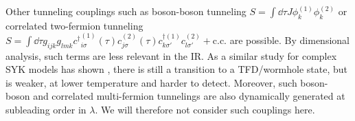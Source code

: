 Other tunneling couplings such as boson-boson tunneling $S=\int\dd\tau J\phi^{(1)}_k\phi^{(2)}_k$ or correlated two-fermion tunneling $S=\int\dd\tau g_{ijk}g_{lmk} {c^\dagger}^{(1)}_{i\sigma}(\tau)c^{(2)}_{j\sigma}(\tau) c^{\dagger(1)}_{k\sigma'}c^{(2)}_{l\sigma'} +\text{c.c.}$ are possible. By dimensional analysis, such terms are less relevant in the IR. As a similar study for complex SYK models has shown \cite{sahooTraversableWormholeHawkingPage2020}, there is still a transition to a TFD/wormhole state, but is weaker, at lower temperature and harder to detect. Moreover, such boson-boson and correlated multi-fermion tunnelings are also dynamically generated at subleading order in $\lambda$. We will therefore not consider such couplings here. 


